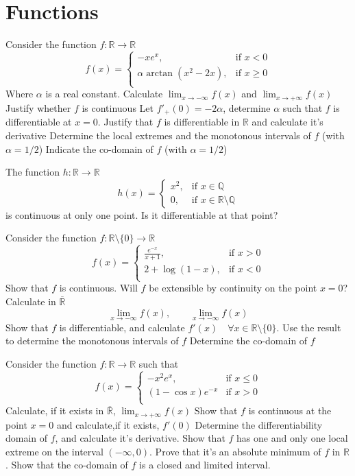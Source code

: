 \documentclass[12pt]{article}
\begin{document}
\section{Functions}
\begin{ExerciseList}
	\Exercise Consider the function $f\colon \mathbb R \to \mathbb R$
	$$f(x) = \begin{cases} -x e^x, & \mbox{if $x<0$} \\ \alpha\arctan(x^2-2x), &\mbox{if $x\ge 0$} \\ \end{cases}$$
	Where $\alpha$ is a real constant.
	\Question Calculate $\lim_{x\to -\infty}f(x)$ and $\lim_{x\to +\infty}f(x)$
	\Question Justify whether $f$ is continuous
	\Question Let $f'_+(0)=-2\alpha$, determine $\alpha$ such that $f$ is differentiable at $x=0$. Justify that $f$ is differentiable in $\mathbb R$ and calculate it's derivative
	\Question Determine the local extremes and the monotonous intervals of $f$ (with $\alpha = 1/2$)
	\Question Indicate the co-domain of $f$ (with $\alpha=1/2$)

	\Exercise The function $h\colon \mathbb R \to \mathbb R$
	$$h(x)=\begin{cases}x^2, & \mbox{if $x\in\mathbb Q$} \\ 0, & \mbox{if $x\in\mathbb R\setminus\mathbb Q$}\end{cases}$$
	is continuous at only one point. Is it differentiable at that point?

	\Exercise Consider the function $f\colon \mathbb R\setminus\{0\}\to\mathbb R$
	$$f(x) = \begin{cases} \frac{e^{-x}}{x+1}, & \mbox{if $x>0$} \\ 2+\log(1-x), & \mbox{if $x<0$} \\ \end{cases}$$
	\Question Show that $f$ is continuous. Will $f$ be extensible by continuity on the point $x=0$?
	\Question Calculate in $\overline{\mathbb R}$
	$$\lim_{x\to -\infty}f(x), \qquad \lim_{x\to -\infty}f(x)$$
	\Question Show that $f$ is differentiable, and calculate $f'(x)\quad\forall x\in\mathbb R\setminus \{ 0\}$.
	Use the result to determine the monotonous intervals of $f$
	\Question Determine the co-domain of $f$

	\Exercise Consider the function $f\colon \mathbb R\to \mathbb R$ such that
	$$f(x)=\begin{cases}-x^2e^x, & \mbox{if $x\le 0$} \\ (1-\cos x)e^{-x} & \mbox{if $x>0$} \\ \end{cases}$$
	\Question Calculate, if it exists in $\overline{\mathbb R}$, $\lim_{x\to +\infty}f(x)$
	\Question Show that $f$ is continuous at the point $x=0$ and calculate,if it exists, $f'(0)$
	\Question Determine the differentiability domain of $f$, and calculate it's derivative.
	\Question Show that $f$ has one and only one local extreme on the interval $(-\infty, 0)$.
	Prove that it's an absolute minimum of $f$ in $\mathbb R$.
	\Question Show that the co-domain of $f$ is a closed and limited interval.
\end{ExerciseList}
\end{document}
